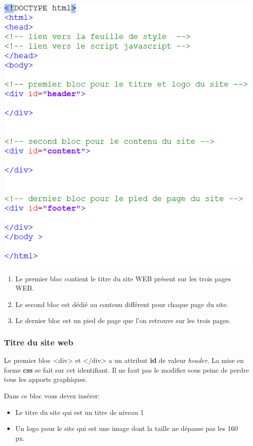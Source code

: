 \includegraphics{img/squelette_page.png}

\begin{enumerate}
\tightlist
\item
  Le premier bloc contient le titre du site WEB présent sur les trois
  pages WEB.
\item
  Le second bloc est dédié au contenu différent pour chaque page du
  site.
\item
  Le dernier bloc est un pied de page que l'on retrouve sur les trois
  pages.
\end{enumerate}

\hypertarget{titre-du-site-web}{%
\subsubsection{Titre du site web}\label{titre-du-site-web}}

Le premier bloc \textless div\textgreater{} et
\textless/div\textgreater{} a un attribut \textbf{id} de valeur
\emph{header}. La mise en forme \textbf{css} se fait sur cet
identifiant. Il ne faut pas le modifier sous peine de perdre tous les
apports graphiques.

Dans ce bloc vous devez insérer:

\begin{itemize}
\tightlist
\item
  Le titre du site qui est un titre de niveau 1
\item
  Un logo pour le site qui est une image dont la taille ne dépasse pas
  les 160 px.
\end{itemize}

